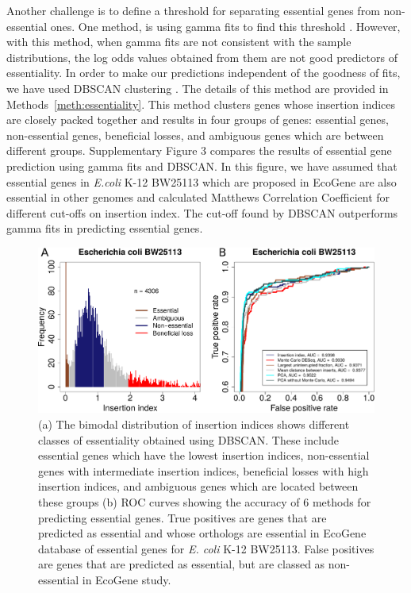 \documentclass[12pt,letterpaper]{article}
\begin{document}
Another challenge is to define a threshold for separating essential genes from non-essential ones. One method, is using gamma fits to find this threshold \cite{barquist_tradis_2016}. However, with this method, when gamma fits are not consistent with the sample distributions, the log odds values obtained from them are not good predictors of essentiality. In order to make our predictions independent of the goodness of fits, we have used DBSCAN clustering \cite{ester_density-based_1996}. The details of this method are provided in Methods~\ref{meth:essentiality}. This method clusters genes whose insertion indices are closely packed together and results in four groups of genes: essential genes, non-essential genes, beneficial losses, and ambiguous genes which are between different groups. Supplementary Figure 3 compares the results of essential gene prediction using gamma fits and DBSCAN. In this figure, we have assumed that essential genes in \textit{E.coli} K-12 BW25113 which are proposed in EcoGene are also essential in other genomes and calculated Matthews Correlation Coefficient for different cut-offs on insertion index. The cut-off found by DBSCAN outperforms gamma fits in predicting essential genes.

\begin{figure}
\includegraphics[scale=0.45]{fig1.pdf}
\caption{(a) The bimodal distribution of insertion indices shows different classes of essentiality obtained using DBSCAN. These include essential genes which have the lowest insertion indices, non-essential genes with intermediate insertion indices, beneficial losses with high insertion indices, and ambiguous genes which are located between these groups (b) ROC curves showing the accuracy of 6 methods for predicting essential genes. True positives are genes that are predicted as essential and whose orthologs are essential in EcoGene database of essential genes for \textit{E. coli} K-12 BW25113. False positives are genes that are predicted as essential, but are classed as non-essential in EcoGene study.}
\label{fig:fig1}
\end{figure}
\end{document}
